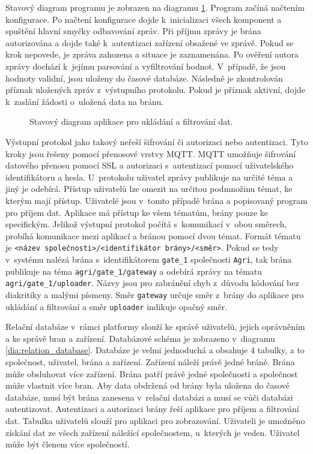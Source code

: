 Stavový diagram programu je zobrazen na diagramu \ref{dia:uploader_state}. Program začíná načtením konfigurace. Po načtení konfigurace dojde k~inicializaci všech komponent a spuštění hlavní smyčky odbavování zpráv. Při příjmu zprávy je brána autorizována a dojde také k~autentizaci zařízení obsažené ve zprávě. Pokud se krok nepovede, je zpráva zahozena a situace je zaznamenána. Po ověření autora zprávy dochází k~jejímu parsování a vyfiltrování hodnot. V~případě, že jsou hodnoty validní, jsou uloženy do časové databáze. Následně je zkontrolován příznak uložených zpráv z~výstupního protokolu. Pokud je příznak aktivní, dojde k~zaslání žádosti o~uložená data na bránu.

\begin{figure}[ht]
  \centering
  
  \caption{Stavový diagram aplikace pro ukládání a filtrování dat.}
  \label{dia:uploader_state}
\end{figure}


Výstupní protokol jako takový neřeší šifrování či autorizaci nebo autentizaci. Tyto kroky jsou řešeny pomocí přenosové vrstvy MQTT. MQTT umožňuje šifrování datového přenosu pomocí SSL a autorizaci s~autentizací pomocí uživatelského identifikátoru a hesla. U~protokolu uživatel zprávy publikuje na určité téma a jiný je odebírá. Přístup uživatelů lze omezit na určitou podmnožinu témat, ke kterým mají přístup. Uživatelé jsou v~tomto případě brána a popisovaný program pro příjem dat. Aplikace má přístup ke všem tématům, brány pouze ke specifickým. Jelikož výstupní protokol počítá s~komunikací v~obou směrech, probíhá komunikace mezi aplikací a bránou pomocí dvou témat. Formát tématu je \verb|<název společnosti>/<identifikátor brány>/<směr>|. Pokud se tedy v~systému nalézá brána s~identifikátorem \verb|gate_1| společnosti \verb|Agri|, tak brána publikuje na téma \verb|agri/gate_1/gateway| a odebírá zprávy na tématu \verb|agri/gate_1/uploader|. Názvy jsou pro zabránění chyb z~důvodu kódování bez diakritiky a malými písmeny. Směr \verb|gateway| určuje směr z~brány do aplikace pro ukládání a filtrování a směr \verb|uploader| indikuje opačný směr.


Relační databáze v~rámci platformy slouží ke správě uživatelů, jejich oprávněním a ke správě bran a zařízení. Databázové schéma je zobrazeno v~diagramu \ref{dia:relation_database}. Databáze je velmi jednoduchá a obsahuje 4 tabulky, a to společnost, uživatel, brána a zařízení. Zařízení náleží právě jedné bráně. Brána může obsluhovat více zařízení. Brána patří právě jedné společnosti a společnost může vlastnit více bran. Aby data obdržená od brány byla uložena do časové databáze, musí být brána zanesena v~relační databázi a musí se vůči databázi autentizovat. Autentizaci a autorizaci brány řeší aplikace pro příjem a filtrování dat. Tabulka uživatelů slouží pro aplikaci pro zobrazování. Uživateli je umožněno získání dat ze všech zařízení náležící společnostem, u~kterých je veden. Uživatel může být členem více společností.

